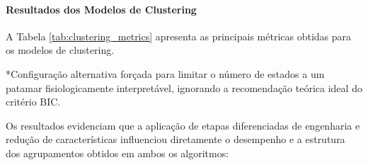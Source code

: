 \paragraph{Resultados dos Modelos de Clustering}

A Tabela \ref{tab:clustering_metrics} apresenta as principais métricas obtidas para os modelos de clustering.

\begin{table}[H]
\centering
\caption{Métricas Estruturais dos Modelos de Clustering}
\label{tab:clustering_metrics}
\end{table}

\noindent
*Configuração alternativa forçada para limitar o número de estados a um patamar fisiologicamente interpretável, ignorando a recomendação teórica ideal do critério BIC.

Os resultados evidenciam que a aplicação de etapas diferenciadas de engenharia e redução de características influenciou diretamente o desempenho e a estrutura dos agrupamentos obtidos em ambos os algoritmos:

